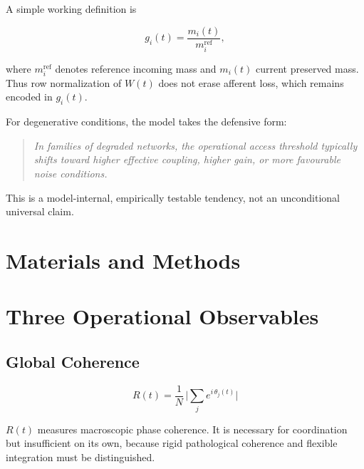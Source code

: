 \documentclass[11pt,a4paper]{article}
\theoremstyle{plain}
\theoremstyle{definition}
\theoremstyle{remark}
\begin{document}
A simple working definition is

\begin{equation}
\label{eq:gain}
g_i(t) = \frac{m_i(t)}{m_i^{\mathrm{ref}}},
\end{equation}

where $m_i^{\mathrm{ref}}$ denotes reference incoming mass and $m_i(t)$ current preserved mass. Thus row normalization of $W(t)$ does not erase afferent loss, which remains encoded in $g_i(t)$.

For degenerative conditions, the model takes the defensive form:

\begin{quote}
\itshape
In families of degraded networks, the operational access threshold typically shifts toward higher effective coupling, higher gain, or more favourable noise conditions.
\end{quote}

This is a model-internal, empirically testable tendency, not an unconditional universal claim.


\section*{Materials and Methods}

\section{Three Operational Observables}
\label{sec:observablen}

\subsection{Global Coherence}

\begin{equation}
\label{eq:R}
R(t) = \frac{1}{N}\,\biggl|\sum_{j} e^{i\,\theta_j(t)}\biggr|
\end{equation}

$R(t)$ measures macroscopic phase coherence. It is necessary for coordination but insufficient on its own, because rigid pathological coherence and flexible integration must be distinguished.
\end{document}
